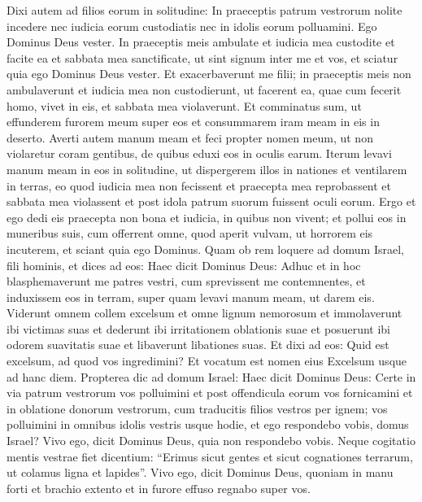 \begin{biblechapter}
\begin{biblechapter}
\begin{biblechapter}
\begin{biblechapter}
\begin{biblechapter}
\begin{biblechapter}
\begin{biblechapter}
\begin{biblechapter}
\begin{biblechapter}
\begin{biblechapter}
\begin{biblechapter}
\begin{biblechapter}
\begin{biblechapter}
\begin{biblechapter}
\begin{biblechapter}
\begin{biblechapter}
\begin{biblechapter}
\begin{biblechapter}
\begin{biblechapter}
\begin{biblechapter}
 \verse Dixi autem ad filios eorum in solitudine: In praeceptis patrum vestrorum nolite incedere nec iudicia eorum custodiatis nec in idolis eorum polluamini. 
 \verse Ego Dominus Deus vester. In praeceptis meis ambulate et iudicia mea custodite et facite ea 
\verse et sabbata mea sanctificate, ut sint signum inter me et vos, et sciatur quia ego Dominus Deus vester. 
\verse Et exacerbaverunt me filii; in praeceptis meis non ambulaverunt et iudicia mea non custodierunt, ut facerent ea, quae cum fecerit homo, vivet in eis, et sabbata mea violaverunt. Et comminatus sum, ut effunderem furorem meum super eos et consummarem iram meam in eis in deserto. 
\verse Averti autem manum meam et feci propter nomen meum, ut non violaretur coram gentibus, de quibus eduxi eos in oculis earum. 
\verse Iterum levavi manum meam in eos in solitudine, ut dispergerem illos in nationes et ventilarem in terras, 
\verse eo quod iudicia mea non fecissent et praecepta mea reprobassent et sabbata mea violassent et post idola patrum suorum fuissent oculi eorum. 
\verse Ergo et ego dedi eis praecepta non bona et iudicia, in quibus non vivent; 
\verse et pollui eos in muneribus suis, cum offerrent omne, quod aperit vulvam, ut horrorem eis incuterem, et sciant quia ego Dominus.
 \verse Quam ob rem loquere ad domum Israel, fili hominis, et dices ad eos: Haec dicit Dominus Deus: Adhuc et in hoc blasphemaverunt me patres vestri, cum sprevissent me contemnentes, 
\verse et induxissem eos in terram, super quam levavi manum meam, ut darem eis. Viderunt omnem collem excelsum et omne lignum nemorosum et immolaverunt ibi victimas suas et dederunt ibi irritationem oblationis suae et posuerunt ibi odorem suavitatis suae et libaverunt libationes suas. 
\verse Et dixi ad eos: Quid est excelsum, ad quod vos ingredimini? Et vocatum est nomen eius Excelsum usque ad hanc diem.
 \verse Propterea dic ad domum Israel: Haec dicit Dominus Deus: Certe in via patrum vestrorum vos polluimini et post offendicula eorum vos fornicamini 
\verse et in oblatione donorum vestrorum, cum traducitis filios vestros per ignem; vos polluimini in omnibus idolis vestris usque hodie, et ego respondebo vobis, domus Israel? Vivo ego, dicit Dominus Deus, quia non respondebo vobis. 
\verse Neque cogitatio mentis vestrae fiet dicentium: “Erimus sicut gentes et sicut cognationes terrarum, ut colamus ligna et lapides”.
 \verse Vivo ego, dicit Dominus Deus, quoniam in manu forti et brachio extento et in furore effuso regnabo super vos. 

\end{biblechapter}
\end{biblechapter}
\end{biblechapter}
\end{biblechapter}
\end{biblechapter}
\end{biblechapter}
\end{biblechapter}
\end{biblechapter}
\end{biblechapter}
\end{biblechapter}
\end{biblechapter}
\end{biblechapter}
\end{biblechapter}
\end{biblechapter}
\end{biblechapter}
\end{biblechapter}
\end{biblechapter}
\end{biblechapter}
\end{biblechapter}
\end{biblechapter}
